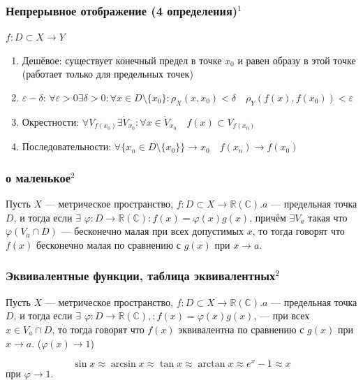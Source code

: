\documentclass{article}
\def\dbl{\,\,}
\begin{document}
\subsubsection{Непрерывное отображение (4 определения)\texorpdfstring{$^1$}{}}
$f : D \subset X \rightarrow Y$
\begin{enumerate}
    \item Дешёвое: существует конечный предел в точке $x_0$ и равен образу в этой точке (работает только для предельных точек)
    \item $\varepsilon-\delta$: $\forall \varepsilon > 0 \exists \delta > 0 : \forall x \in D \setminus \{x_0\}: \rho_X(x, x_0) < \delta \quad \rho_Y(f(x), f(x_0)) < \varepsilon$
    \item Окрестности: $\forall V_{f(x_0)} \exists \dot{V}_{x_0} : \forall x \in \dot{V}_{x_0} \quad f(x) \subset V_{f(x_0)}$
    \item Последовательности: $\forall \{x_n \in D\setminus\{x_0\}\} \rightarrow x_0 \quad f(x_n) \rightarrow f(x_0)$
\end{enumerate}

\subsubsection{о маленькое\texorpdfstring{$^2$}{}}

Пусть $X$ --- метрическое пространство, $f: D \subset X \rightarrow \mathbb{R} (\mathbb{C}). a$ --- предельная точка $D$, и тогда если $\exists \dbl \varphi: D \rightarrow \mathbb{R} (\mathbb{C}) : f(x) = \varphi(x)g(x)$, причём $\exists V_a$ такая что $\varphi(V_a \cap D)$ --- бесконечно малая при всех допустимых $x$, то тогда говорят что $f(x)$ бесконечно малая по сравнению с $g(x)$ при $x \rightarrow a$.

\subsubsection{Эквивалентные функции, таблица эквивалентных\texorpdfstring{$^2$}{}}

Пусть $X$ --- метрическое пространство, $f: D \subset X \rightarrow \mathbb{R} (\mathbb{C}). a$ --- предельная точка $D$, и тогда если $\exists \dbl \varphi: D \rightarrow \mathbb{R} (\mathbb{C}),  : f(x) = \varphi(x)g(x)$, --- при всех $x \in V_a \cap D$, то тогда говорят что $f(x)$ эквивалентна по сравнению с $g(x)$ при $x \rightarrow a$. ($\varphi(x) \rightarrow 1$)

\[\sin x \approx \arcsin x \approx \tan x \approx \arctan x \approx e^x - 1 \approx x\] при $\varphi \rightarrow 1$.
\end{document}

